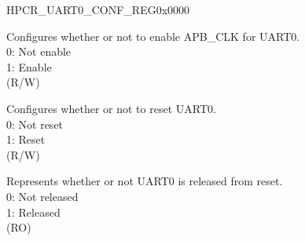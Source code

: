 \begin{register}{H}{PCR\_UART0\_CONF\_REG}{0x0000}\label{regdesc:PCRUART0CONFREG}
%
%
%
%
\regnewline%
\begin{regdesc}\begin{reglist}
\label{fielddesc:PCRUART0CLKEN}\item [PCR\_UART0\_CLK\_EN] Configures whether or not to enable APB\_CLK for UART0.\\
0: Not enable\\
1: Enable\\ (R/W)
\label{fielddesc:PCRUART0RSTEN}\item [PCR\_UART0\_RST\_EN] Configures whether or not to reset UART0.\\
0: Not reset\\
1: Reset\\
(R/W)
\label{fielddesc:PCRUART0READY}\item [PCR\_UART0\_READY] Represents whether or not UART0 is released from reset.\\
0: Not released\\
1: Released\\ (RO)
\end{reglist}\end{regdesc}
\end{register}


